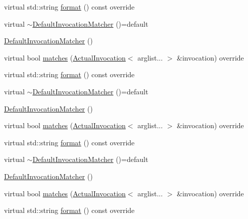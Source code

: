 \begin{DoxyCompactItemize}
virtual std\+::string \mbox{\hyperlink{structfakeit_1_1DefaultInvocationMatcher_a056fc7516e51e5eb15831359cb376fef}{format}} () const override
\item 
virtual \mbox{\hyperlink{structfakeit_1_1DefaultInvocationMatcher_afa983748ccd4ec5a8293d2621bdc0b76}{$\sim$\+Default\+Invocation\+Matcher}} ()=default
\item 
\mbox{\hyperlink{structfakeit_1_1DefaultInvocationMatcher_ae7aacc110f471b0278cdea99d3e0d287}{Default\+Invocation\+Matcher}} ()
\item 
virtual bool \mbox{\hyperlink{structfakeit_1_1DefaultInvocationMatcher_a6eec95726a684a4dc2498b00e68e8166}{matches}} (\mbox{\hyperlink{structfakeit_1_1ActualInvocation}{Actual\+Invocation}}$<$ arglist... $>$ \&invocation) override
\item 
virtual std\+::string \mbox{\hyperlink{structfakeit_1_1DefaultInvocationMatcher_a056fc7516e51e5eb15831359cb376fef}{format}} () const override
\item 
virtual \mbox{\hyperlink{structfakeit_1_1DefaultInvocationMatcher_afa983748ccd4ec5a8293d2621bdc0b76}{$\sim$\+Default\+Invocation\+Matcher}} ()=default
\item 
\mbox{\hyperlink{structfakeit_1_1DefaultInvocationMatcher_ae7aacc110f471b0278cdea99d3e0d287}{Default\+Invocation\+Matcher}} ()
\item 
virtual bool \mbox{\hyperlink{structfakeit_1_1DefaultInvocationMatcher_a6eec95726a684a4dc2498b00e68e8166}{matches}} (\mbox{\hyperlink{structfakeit_1_1ActualInvocation}{Actual\+Invocation}}$<$ arglist... $>$ \&invocation) override
\item 
virtual std\+::string \mbox{\hyperlink{structfakeit_1_1DefaultInvocationMatcher_a056fc7516e51e5eb15831359cb376fef}{format}} () const override
\item 
virtual \mbox{\hyperlink{structfakeit_1_1DefaultInvocationMatcher_afa983748ccd4ec5a8293d2621bdc0b76}{$\sim$\+Default\+Invocation\+Matcher}} ()=default
\item 
\mbox{\hyperlink{structfakeit_1_1DefaultInvocationMatcher_ae7aacc110f471b0278cdea99d3e0d287}{Default\+Invocation\+Matcher}} ()
\item 
virtual bool \mbox{\hyperlink{structfakeit_1_1DefaultInvocationMatcher_a6eec95726a684a4dc2498b00e68e8166}{matches}} (\mbox{\hyperlink{structfakeit_1_1ActualInvocation}{Actual\+Invocation}}$<$ arglist... $>$ \&invocation) override
\item 
virtual std\+::string \mbox{\hyperlink{structfakeit_1_1DefaultInvocationMatcher_a056fc7516e51e5eb15831359cb376fef}{format}} () const override

\end{DoxyCompactItemize}
